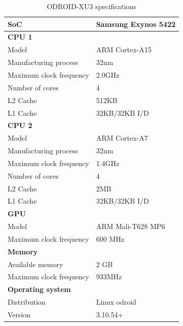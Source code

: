 \begin{table}[H]
  \begin{tabular}{ll}
    \toprule
    \textbf{SoC}              & Samsung Exynos 5422 \\
    \midrule
    \textbf{CPU 1}            &  \\
    Model                     & ARM Cortex-A15 \\
    Manufacturing process     & 32nm \\
    Maximum clock frequency   & 2.0GHz \\
    Number of cores           & 4 \\
    L2 Cache                  & 512KB \\
    L1 Cache                  & 32KB/32KB I/D \\
    \midrule
    \textbf{CPU 2}            &  \\
    Model                     & ARM Cortex-A7 \\
    Manufacturing process     & 32nm \\
    Maximum clock frequency   & 1.4GHz \\
    Number of cores           & 4 \\
    L2 Cache                  & 2MB \\
    L1 Cache                  & 32KB/32KB I/D \\
    \midrule
    \textbf{GPU}              &  \\
    Model                     & ARM Mali-T628 MP6 \\
    Maximum clock frequency   & 600 MHz \\
    \midrule
    \textbf{Memory}           &  \\
    Available memory          & 2 GB \\
    Maximum clock frequency   & 933MHz \\
    \midrule
    \textbf{Operating system} &  \\
    Distribution              & Linux odroid \\
    Version                   & 3.10.54+ \\
    \bottomrule
  \end{tabular}
  \caption{ODROID-XU3 specifications\label{overflow}}
\end{table}

